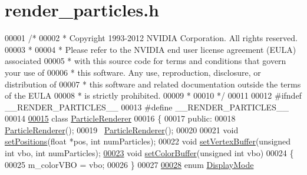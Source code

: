 \hypertarget{render__particles_8h_source}{\section{render\-\_\-particles.\-h}
}

\begin{DoxyCode}
00001 \textcolor{comment}{/*}
00002 \textcolor{comment}{ * Copyright 1993-2012 NVIDIA Corporation.  All rights reserved.}
00003 \textcolor{comment}{ *}
00004 \textcolor{comment}{ * Please refer to the NVIDIA end user license agreement (EULA) associated}
00005 \textcolor{comment}{ * with this source code for terms and conditions that govern your use of}
00006 \textcolor{comment}{ * this software. Any use, reproduction, disclosure, or distribution of}
00007 \textcolor{comment}{ * this software and related documentation outside the terms of the EULA}
00008 \textcolor{comment}{ * is strictly prohibited.}
00009 \textcolor{comment}{ *}
00010 \textcolor{comment}{ */}
00011 
00012 \textcolor{preprocessor}{#}\textcolor{preprocessor}{ifndef} \textcolor{preprocessor}{\_\_RENDER\_PARTICLES\_\_}
00013 \textcolor{preprocessor}{#}\textcolor{preprocessor}{define} \textcolor{preprocessor}{\_\_RENDER\_PARTICLES\_\_}
00014 
\hypertarget{render__particles_8h_source_l00015}{}\hyperlink{class_particle_renderer}{00015} \textcolor{keyword}{class} \hyperlink{class_particle_renderer}{ParticleRenderer}
00016 \{
00017     \textcolor{keyword}{public}:
00018         \hyperlink{class_particle_renderer_a1718484686c2e6db488cc88c433d03cc}{ParticleRenderer}();
00019         ~\hyperlink{class_particle_renderer_a281be31ad850fead012460fb6675db98}{ParticleRenderer}();
00020 
00021         \textcolor{keywordtype}{void} \hyperlink{class_particle_renderer_adb3204e8af23a65b05b1aca7f43f0430}{setPositions}(\textcolor{keywordtype}{float} *pos, \textcolor{keywordtype}{int} numParticles);
00022         \textcolor{keywordtype}{void} \hyperlink{class_particle_renderer_a9c0d44ba7666ab432004a5df4cbb2b59}{setVertexBuffer}(\textcolor{keywordtype}{unsigned} \textcolor{keywordtype}{int} vbo, \textcolor{keywordtype}{int} numParticles);
\hypertarget{render__particles_8h_source_l00023}{}\hyperlink{class_particle_renderer_af16e23ebcee20753d86d24e4e5e32c7c}{00023}         \textcolor{keywordtype}{void} \hyperlink{class_particle_renderer_af16e23ebcee20753d86d24e4e5e32c7c}{setColorBuffer}(\textcolor{keywordtype}{unsigned} \textcolor{keywordtype}{int} vbo)
00024         \{
00025             m\_colorVBO = vbo;
00026         \}
00027 
\hypertarget{render__particles_8h_source_l00028}{}\hyperlink{class_particle_renderer_a7b691afffd1abe415cb0ce17fd26f3d5}{00028}         \textcolor{keyword}{enum} \hyperlink{class_particle_renderer_a7b691afffd1abe415cb0ce17fd26f3d5}{DisplayMode}

\end{DoxyCode}
